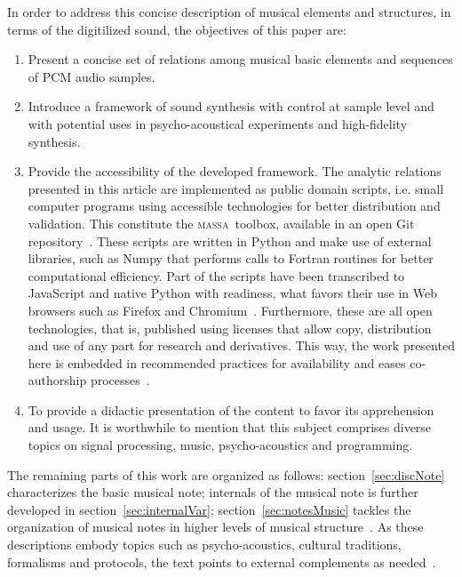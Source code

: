 \documentclass[
 aip,
 jmp,
 amsmath,amssymb,
 reprint,
]{revtex4-1}
\newcommand{\massa}{{\large \textsc{massa}}}
\begin{document}
In order to address this concise description of musical elements and structures, in terms of the digitilized sound, the objectives of this paper are:

\begin{enumerate}

\item Present a concise set of relations among musical basic elements and sequences of PCM audio samples. 

\item Introduce a framework of sound synthesis with control at sample level and with potential uses in psycho-acoustical experiments and high-fidelity synthesis.

\item Provide the accessibility of the developed framework. The analytic relations presented in this article are implemented as public domain scripts, i.e. small computer programs using accessible technologies for better distribution and validation. This constitute the \massa\ toolbox, available in an open Git repository~\cite{gitBook}. These scripts are written in Python and make use of external libraries, such as Numpy that performs calls to Fortran routines for better computational efficiency. Part of the scripts have been transcribed to JavaScript and native Python with readiness, what favors their use in Web browsers such as Firefox and Chromium~\cite{numpy, audiolab, tutpython, python}. Furthermore, these are all open technologies, that is, published using licenses that allow copy, distribution and use of any part for research and derivatives. This way, the work presented here is embedded in recommended practices for availability and eases co-authorship processes~\cite{Raymond,Lessig}.

\item To provide a didactic presentation of the content to favor its apprehension and usage. It is worthwhile to mention that this subject comprises diverse topics on signal processing, music, psycho-acoustics and programming.

\end{enumerate}

The remaining parts of this work are organized as follows: section~\ref{sec:discNote} characterizes the basic musical note; internals of the musical note is further developed in section~\ref{sec:internalVar}; section~\ref{sec:notesMusic} tackles the organization of musical notes in higher levels of musical structure~\cite{Wisnick,Webern,Lerdhal,Cook,Lacerda}. As these descriptions embody topics such as psycho-acoustics, cultural traditions, formalisms and protocols, the text points to external complements as needed~\cite{Zamacois,Schoenberg,microsound}.
\end{document}
